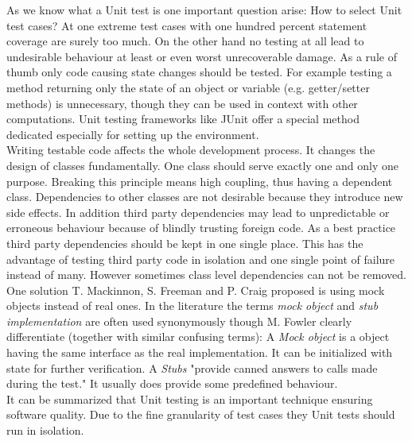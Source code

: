\documentclass[12pt, notitlepage]{article}
\begin{document}
As we know what a Unit test is one important question arise: How to select Unit test cases? At one extreme test cases with one hundred percent statement coverage
are surely too much. On the other hand no testing at all lead to undesirable behaviour at least or even worst unrecoverable damage. 
As a rule of thumb only code causing state changes should be tested. For example testing a method returning only the state of an object or variable (e.g. getter/setter methods) is unnecessary, though they can be used in context with other computations. Unit testing frameworks 
like JUnit\cite{junit} offer a special method dedicated especially for setting up the environment.\\
Writing testable code affects the whole development process. It changes the design of classes fundamentally. One class should serve exactly one and only one purpose. Breaking this principle means high coupling, thus having a dependent class. Dependencies to other classes are not desirable because they introduce new
side effects. In addition third party dependencies may lead to unpredictable or erroneous behaviour because of blindly trusting foreign code.
As a best practice third party dependencies should be kept in one single place. This has the advantage of testing third party code in isolation 
and one single point of failure instead of many. However sometimes class level dependencies can not be removed.
One solution T. Mackinnon, S. Freeman and P. Craig proposed\cite{mock-objects} is using mock objects instead of real ones. In the literature the terms \textit{mock object} and \textit{stub implementation} are often used synonymously though M. Fowler clearly differentiate\cite{fowlermocks} (together with similar confusing terms): A \textit{Mock object} is a object having the same interface as the real implementation. It can be initialized with state for further verification. 
A \textit{Stubs} "provide canned answers to calls made during the test." It usually does provide some predefined behaviour.\\ 
It can be summarized that Unit testing is an important technique ensuring software quality. Due to the fine granularity of test cases they Unit tests 
should run in isolation. 
\end{document}
